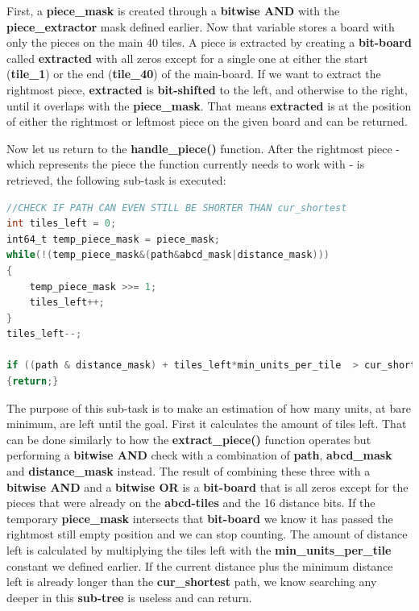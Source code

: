 \documentclass[12pt]{article}
\begin{document}
First, a \textbf{piece\_mask} is created through a \textbf{bitwise AND} with the \textbf{piece\_extractor} mask defined earlier. Now that variable stores a board with only the pieces on the main 40 tiles. A piece is extracted by creating a \textbf{bit-board} called \textbf{extracted} with all zeros except for a single one at either the start (\textbf{tile\_1}) or the end (\textbf{tile\_40}) of the main-board. If we want to extract the rightmost piece, \textbf{extracted} is \textbf{bit-shifted} to the left, and otherwise to the right, until it overlaps with the \textbf{piece\_mask}. That means \textbf{extracted} is at the position of either the rightmost or leftmost piece on the given board and can be returned.

\newpage

Now let us return to the \textbf{handle\_piece()} function. After the rightmost piece - which represents the piece the function currently needs to work with - is retrieved, the following sub-task is executed:


\begin{lstlisting}[language=C, caption={Return condition}, label={lst:return-condition}]
//CHECK IF PATH CAN EVEN STILL BE SHORTER THAN cur_shortest
int tiles_left = 0;
int64_t temp_piece_mask = piece_mask;
while(!(temp_piece_mask&(path&abcd_mask|distance_mask)))
{
    temp_piece_mask >>= 1;
    tiles_left++;
}
tiles_left--;

if ((path & distance_mask) + tiles_left*min_units_per_tile  > cur_shortest)
{return;}

\end{lstlisting}

The purpose of this sub-task is to make an estimation of how many units, at bare minimum, are left until the goal. First it calculates the amount of tiles left. That can be done similarly to how the \textbf{extract\_piece()} function operates but performing a \textbf{bitwise AND} check with a combination of \textbf{path}, \textbf{abcd\_mask} and \textbf{distance\_mask} instead. The result of combining these three with a \textbf{bitwise AND} and a \textbf{bitwise OR} is a \textbf{bit-board} that is all zeros except for the pieces that were already on the \textbf{abcd-tiles} and the 16 distance bits. If the temporary \textbf{piece\_mask} intersects that \textbf{bit-board} we know it has passed the rightmost still empty position and we can stop counting.
The amount of distance left is calculated by multiplying the tiles left with the \textbf{min\_units\_per\_tile} constant we defined earlier. If the current distance plus the minimum distance left is already longer than the \textbf{cur\_shortest} path, we know searching any deeper in this \textbf{sub-tree} is useless and can return.
\linebreak
\end{document}
